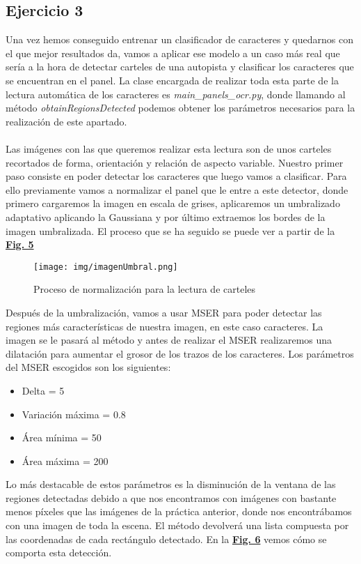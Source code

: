 \documentclass[a4paper, 12pt]{article}
\begin{document}
\subsection{Ejercicio 3}
Una vez hemos conseguido entrenar un clasificador de caracteres y quedarnos con el que mejor resultados da, vamos a aplicar ese modelo a un caso más real que sería a la hora de detectar carteles de una autopista y clasificar los caracteres que se encuentran en el panel. La clase encargada de realizar toda esta parte de la lectura automática de los caracteres es \textit{main\_panels\_ocr.py}, donde llamando al método \textit{obtainRegionsDetected} podemos obtener los parámetros necesarios para la realización de este apartado. \\\\
Las imágenes con las que queremos realizar esta lectura son de unos carteles recortados de forma, orientación y relación de aspecto variable. Nuestro primer paso consiste en poder detectar los caracteres que luego vamos a clasificar. Para ello previamente vamos a normalizar el panel que le entre a este detector, donde primero cargaremos la imagen en escala de grises, aplicaremos un umbralizado adaptativo aplicando la Gaussiana y por último extraemos los bordes de la imagen umbralizada. El proceso que se ha seguido se puede ver a partir de la \textbf{\hyperref[fig:normalizacion]{Fig. 5}}
\newpage
\begin{figure}[h]
	\centering
	\texttt{[image: img/imagenUmbral.png]}
 	\caption{Proceso de normalización para la lectura de carteles}\vspace{0.5cm}
	\label{fig:normalizacion}
\end{figure}
Después de la umbralización, vamos a usar MSER para poder detectar las regiones más características de nuestra imagen, en este caso caracteres. La imagen se le pasará al método y antes de realizar el MSER realizaremos una dilatación para aumentar el grosor de los trazos de los caracteres. Los parámetros del MSER escogidos son los siguientes:
\begin{itemize}
    \item Delta = 5
    \item Variación máxima = 0.8
    \item Área mínima = 50
    \item Área máxima = 200
\end{itemize}
Lo más destacable de estos parámetros es la disminución de la ventana de las regiones detectadas debido a que nos encontramos con imágenes con bastante menos píxeles que las imágenes de la práctica anterior, donde nos encontrábamos con una imagen de toda la escena. El método devolverá una lista compuesta por las coordenadas de cada rectángulo detectado. En la \textbf{\hyperref[fig:normalizacion]{Fig. 6}} vemos cómo se comporta esta detección. 
\end{document}
